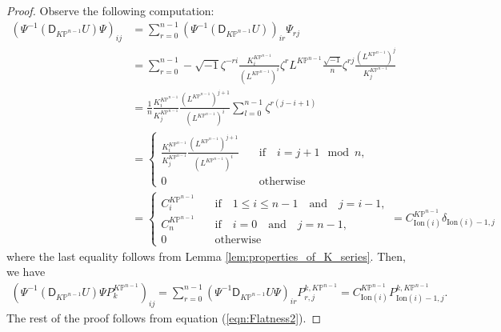 \documentclass[12pt]{amsart}
\numberwithin{equation}{section}
\newcommand{\KP}{K\mathbb{P}}
\begin{document}
\begin{proof}
Observe the following computation:
\begin{align*}
\left(\Psi^{-1}\left(\mathsf{D}_{\KP^{n-1}}U\right)\Psi\right)_{ij}
&=\sum_{r=0}^{n-1}\left(\Psi^{-1}\left(\mathsf{D}_{\KP^{n-1}}U\right)\right)_{ir}\Psi_{rj}\\
&=\sum_{r=0}^{n-1}-\sqrt{-1}\zeta^{-r{i}}\frac{K^{\KP^{n-1}}_{i}}{(L^{\KP^{n-1}})^{i}}{\zeta^r}L^{\KP^{n-1}}\frac{\sqrt{-1}}{n}\zeta^{rj}\frac{(L^{\KP^{n-1}})^j}{K^{\KP^{n-1}}_j}\\
&=\frac{1}{n}\frac{K^{\KP^{n-1}}_i}{K^{\KP^{n-1}}_j}\frac{(L^{\KP^{n-1}})^{j+1}}{(L^{\KP^{n-1}})^i}\sum_{l=0}^{n-1}\zeta^{r(j-i+1)}\\
&=\begin{cases}
  \frac{K^{\KP^{n-1}}_i}{K^{\KP^{n-1}}_j}\frac{(L^{\KP^{n-1}})^{j+1}}{(L^{\KP^{n-1}})^i}&\quad\text{if}\quad i=j+1\mod{n},\\
  0&\quad\text{otherwise}
  \end{cases}\\
&=
  \begin{cases}
  C^{\KP^{n-1}}_i&\quad\text{if}\quad 1\leq i\leq {n-1}\quad\text{and}\quad j={i-1},\\
  C^{\KP^{n-1}}_n&\quad\text{if}\quad i=0\quad\text{and}\quad j={n-1},\\
  0&\quad\text{otherwise}
  \end{cases}
=C^{\KP^{n-1}}_{\mathrm{Ion}(i)}\delta_{\mathrm{Ion}(i)-1,j}
\end{align*}
where the last equality follows from Lemma \ref{lem:properties_of_K_series}.
Then, we have
\begin{equation*}
\begin{aligned}
\left(\Psi^{-1}\left(\mathsf{D}_{\KP^{n-1}}U\right)\Psi{P^{\KP^{n-1}}_k}\right)_{ij}
=\sum_{r=0}^{n-1}\left(\Psi^{-1}\mathsf{D}_{\KP^{n-1}}U\Psi\right)_{ir}P^{k,\KP^{n-1}}_{r,j}
=C^{\KP^{n-1}}_{\mathrm{Ion}(i)}P^{k,\KP^{n-1}}_{\mathrm{Ion}(i)-1,j}.
\end{aligned}
\end{equation*}
The rest of the proof follows from equation (\ref{eqn:Flatness2}).
\end{proof}
\end{document}
